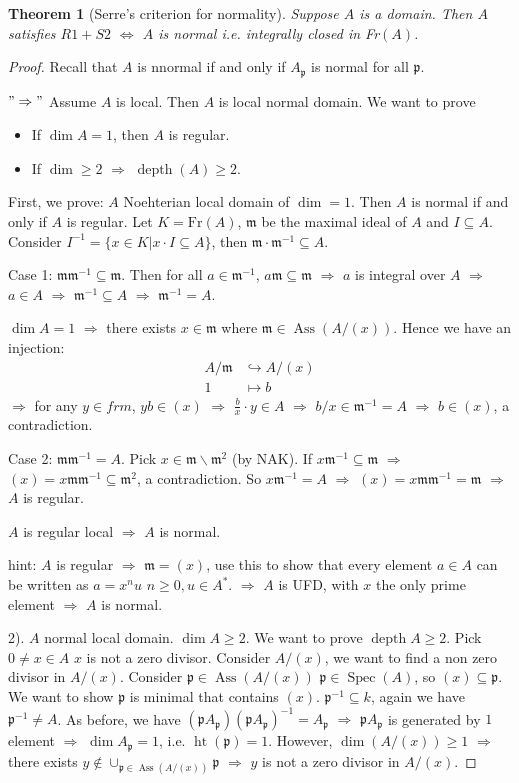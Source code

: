 \documentclass[cs4size]{article}
\newcommand{\de}{\backslash}
\newcommand{\su}{\subseteq}
\newcommand{\frm}{\mathfrak{m}}
\newcommand{\frp}{\mathfrak{p}}
\newcommand{\Ra}{\Rightarrow}
\DeclareMathOperator{\Spec}{Spec}
\DeclareMathOperator{\Ass}{Ass}
\DeclareMathOperator{\height}{ht}
\DeclareMathOperator{\depth}{depth}
\newtheorem{thm}{Theorem}
\begin{document}
\begin{thm}[Serre's criterion for normality]
Suppose $A$ is a domain. Then $A$ satisfies $R1+S2$ $\Leftrightarrow$ $A$ is normal i.e. integrally closed in Fr$(A)$.
\end{thm}
\begin{proof}
Recall that $A$ is nnormal if and only if $A_\frp$ is normal for all $\frp$.

$"\Ra"$ Assume $A$ is local. Then $A$ is local normal domain. We want to prove
\begin{itemize}
\item If $\dim A=1$, then $A$ is regular.
\item If $\dim\geq 2$ $\Ra $ $\depth(A)\geq 2$.
\end{itemize}
First, we prove: $A$ Noehterian local domain of $\dim=1$. Then $A$ is normal if and only if $A$ is regular. Let $K=\text{Fr}(A)$, $\frm$ be the maximal ideal of $A$ and $I\su A$. Consider $I^{-1}=\{x\in K|x\cdot I\su A\}$, then $\frm\cdot\frm^{-1}\su A$.

Case 1: $\frm\frm^{-1}\su \frm$. Then for all $a\in\frm^{-1}$, $a\frm\su\frm$ $\Ra$ $a$ is integral over $A$ $\Ra$ $a\in A$ $\Ra$ $\frm^{-1}\su A$ $\Ra$ $\frm^{-1}=A$.

$\dim A=1$ $\Ra$ there exists $x\in \frm$ where $\frm\in \Ass(A/(x))$. Hence we have an injection:
\begin{align*}
A/\frm&\hookrightarrow A/(x)\\
1&\mapsto b
\end{align*}
$\Ra$ for any $y\in frm$, $yb\in (x)$ $\Ra$ $\frac{b}{x}\cdot y\in A$ $\Ra$ $b/x\in \frm^{-1}=A$ $\Ra$ $b\in (x)$, a contradiction.

Case 2: $\frm\frm^{-1}=A$. Pick $x\in\frm\de\frm^2$ (by NAK). If $x\frm^{-1}\su \frm$ $\Ra$ $(x)=x\frm\frm^{-1}\su \frm^2$, a contradiction. So $x\frm^{-1}=A$ $\Ra$ $(x)=x\frm\frm^{-1}=\frm$ $\Ra$ $A$ is regular.

$A$ is regular local $\Ra$ $A$ is normal.

hint: $A$ is regular $\Ra$ $\frm=(x)$, use this to show that every element $a\in A$ can be written as $a=x^nu$ $n\geq 0,u\in A^*$. $\Ra$ $A$ is UFD, with $x$ the only prime element $\Ra$ $A$ is normal.

2). $A$ normal local domain. $\dim A\geq 2$. We want to prove $\depth A\geq 2$. Pick $0\neq x\in A$ $x$ is not a zero divisor. Consider $A/(x)$, we want to find a non zero divisor in $A/(x)$. Consider $\frp\in \Ass(A/(x))$ $\frp\in\Spec(A)$, so $(x)\su \frp$. We want to show $\frp$ is minimal that contains $(x)$. $\frp^{-1}\su k$, again we have $\frp^{-1}\neq A$. As before, we have $(\frp A_\frp)(\frp A_\frp)^{-1}=A_\frp$ $\Ra$ $\frp A_\frp$ is generated by $1$ element $\Ra$ $\dim A_\frp=1$, i.e. $\height (\frp)=1$. However, $\dim (A/(x))\geq 1$ $\Ra$ there exists $y\notin \cup_{\frp\in \Ass(A/(x))}\frp$ $\Ra$ $y$ is not a zero divisor in $A/(x)$.


\end{proof}
\end{document}
